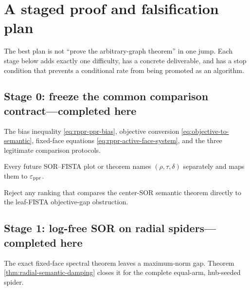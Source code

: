 \section{A staged proof and falsification plan}
\label{sec:research-plan}

The best plan is not ``prove the arbitrary-graph theorem'' in one jump.  Each
stage below adds exactly one difficulty, has a concrete deliverable, and has a
stop condition that prevents a conditional rate from being promoted as an
algorithm.

\subsection{Stage 0: freeze the common comparison contract---completed here}

\begin{description}[leftmargin=2.7cm,style=nextline]
\item[Deliverable]
The bias inequality \eqref{eq:rppr-ppr-bias}, objective conversion
\eqref{eq:objective-to-semantic}, fixed-face equations
\eqref{eq:rppr-active-face-system}, and the three legitimate comparison
protocols.
\item[Go condition]
Every future SOR--FISTA plot or theorem names $(\rho,\tau,\delta)$ separately
and maps them to $\varepsilon_{\rm ppr}$.
\item[Stop condition]
Reject any ranking that compares the center-SOR semantic theorem directly to
the leaf-FISTA objective-gap obstruction.
\end{description}

\subsection{Stage 1: log-free SOR on radial spiders---completed here}

The exact fixed-face spectral theorem leaves a maximum-norm gap.  Theorem
\ref{thm:radial-semantic-damping} closes it for the complete equal-arm,
hub-seeded spider.

